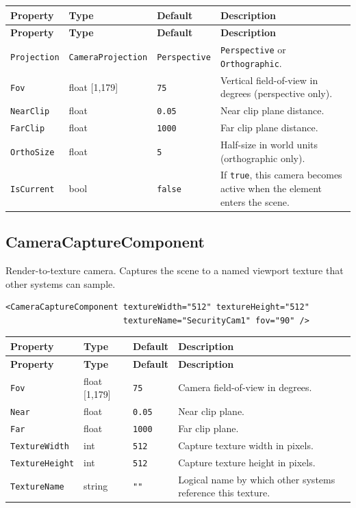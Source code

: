 \documentclass[11pt,a4paper]{article}
\begin{document}
\begin{longtable}{P{3.2cm} P{2.2cm} P{2.5cm} P{5.1cm}}
  \toprule
  \textbf{Property} & \textbf{Type} & \textbf{Default} & \textbf{Description} \\
  \midrule
  \endfirsthead
  \toprule
  \textbf{Property} & \textbf{Type} & \textbf{Default} & \textbf{Description} \\
  \midrule
  \endhead
  \texttt{Projection} & \texttt{CameraProjection} & \texttt{Perspective} &
    \texttt{Perspective} or \texttt{Orthographic}. \\
  \texttt{Fov} & float [1,179] & \texttt{75} &
    Vertical field-of-view in degrees (perspective only). \\
  \texttt{NearClip} & float & \texttt{0.05} & Near clip plane distance. \\
  \texttt{FarClip} & float & \texttt{1000} & Far clip plane distance. \\
  \texttt{OrthoSize} & float & \texttt{5} &
    Half-size in world units (orthographic only). \\
  \texttt{IsCurrent} & bool & \texttt{false} &
    If \texttt{true}, this camera becomes active when the element enters the scene. \\
  \bottomrule
\end{longtable}

\subsection{CameraCaptureComponent}

Render-to-texture camera. Captures the scene to a named viewport texture
that other systems can sample.

\begin{lstlisting}
<CameraCaptureComponent textureWidth="512" textureHeight="512"
                        textureName="SecurityCam1" fov="90" />
\end{lstlisting}

\begin{longtable}{P{3.5cm} P{2cm} P{2.2cm} P{5.3cm}}
  \toprule
  \textbf{Property} & \textbf{Type} & \textbf{Default} & \textbf{Description} \\
  \midrule
  \endfirsthead
  \toprule
  \textbf{Property} & \textbf{Type} & \textbf{Default} & \textbf{Description} \\
  \midrule
  \endhead
  \texttt{Fov} & float [1,179] & \texttt{75} & Camera field-of-view in degrees. \\
  \texttt{Near} & float & \texttt{0.05} & Near clip plane. \\
  \texttt{Far} & float & \texttt{1000} & Far clip plane. \\
  \texttt{TextureWidth} & int & \texttt{512} & Capture texture width in pixels. \\
  \texttt{TextureHeight} & int & \texttt{512} & Capture texture height in pixels. \\
  \texttt{TextureName} & string & \texttt{""} &
    Logical name by which other systems reference this texture. \\
  \bottomrule
\end{longtable}
\end{document}
